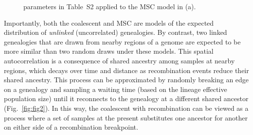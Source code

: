 \documentclass[11pt]{article}
\begin{document}
\begin{figure}
{		parameters in Table~S2 applied to the MSC model in (a).
	}
	\label{fig:fig1}
\end{figure}


Importantly, both the coalescent and MSC are models of the expected distribution of 
\emph{unlinked} (uncorrelated) genealogies.
By contrast, two linked genealogies that are drawn from nearby regions of a genome %
are expected to be more similar than two random draws under these models. This spatial 
autocorrelation is a consequence of shared ancestry among samples at nearby regions, 
which decays over time and distance as recombination events reduce their shared ancestry.
This process can be approximated by randomly breaking an edge on a genealogy and sampling
a waiting time (based on the lineage effective population size) until it reconnects
to the genealogy at a different shared ancestor (Fig.~\ref{fig:fig2}). 
In this way, the coalescent with recombination 
can be viewed as a process 
where a set of samples at the present substitutes one ancestor for another on 
either side of a recombination breakpoint. 
\end{document}
